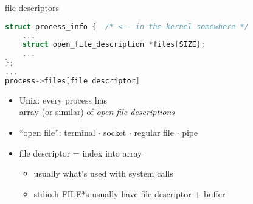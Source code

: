 \begin{frame}[fragile,label=fds]{file descriptors}
\begin{lstlisting}[language=C,style=smaller]
struct process_info {  /* <-- in the kernel somewhere */
    ...
    struct open_file_description *files[SIZE};
    ...
};
...
process->files[file_descriptor]
\end{lstlisting}
    \begin{itemize}
    \item Unix: every process has \\
        array (or similar) of \textit{open file descriptions}
    \item ``open file'': {\small terminal $\cdot$ socket $\cdot$ regular file $\cdot$ pipe}
    \item file descriptor = index into array
        \begin{itemize}
        \item usually what's used with system calls
        \item stdio.h FILE*s usually have file descriptor + buffer
        \end{itemize}
    \end{itemize}
\end{frame}


